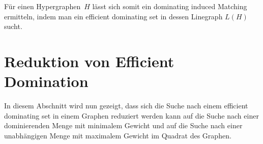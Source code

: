 %
Für einen Hypergraphen~$H$ lässt sich somit ein dominating induced Matching ermitteln, indem man ein efficient dominating set in dessen Linegraph $L(H)$ sucht.

\section{Reduktion von Efficient Domination}\label{sec:Reduktion}
In diesem Abschnitt wird nun gezeigt, dass sich die Suche nach einem efficient dominating set in einem Graphen reduziert werden kann auf die Suche nach einer dominierenden Menge mit minimalem Gewicht und auf die Suche nach einer unabhängigen Menge mit maximalem Gewicht im Quadrat des Graphen.

